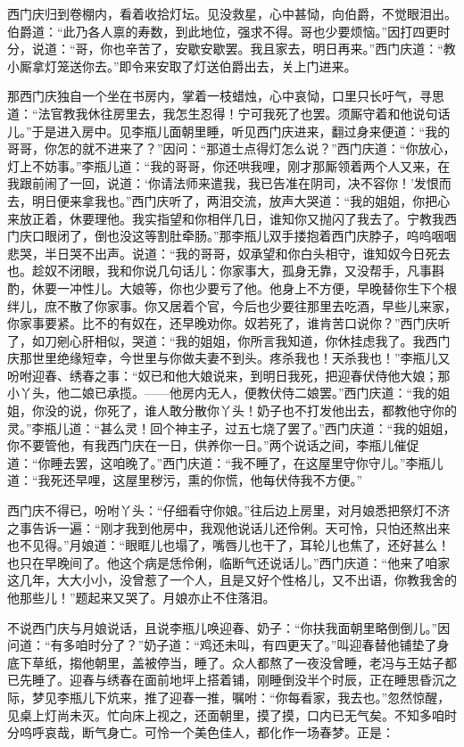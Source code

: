 西门庆归到卷棚内，看着收拾灯坛。见没救星，心中甚恸，向伯爵，不觉眼泪出。伯爵道：“此乃各人禀的寿数，到此地位，强求不得。哥也少要烦恼。”因打四更时分，说道：“哥，你也辛苦了，安歇安歇罢。我且家去，明日再来。”西门庆道：“教小厮拿灯笼送你去。”即令来安取了灯送伯爵出去，关上门进来。

那西门庆独自一个坐在书房内，掌着一枝蜡烛，心中哀恸，口里只长吁气，寻思道：“法官教我休往房里去，我怎生忍得！宁可我死了也罢。须厮守着和他说句话儿。”于是进入房中。见李瓶儿面朝里睡，听见西门庆进来，翻过身来便道：“我的哥哥，你怎的就不进来了？”因问：“那道士点得灯怎么说？”西门庆道：“你放心，灯上不妨事。”李瓶儿道：“我的哥哥，你还哄我哩，刚才那厮领着两个人又来，在我跟前闹了一回，说道：‘你请法师来遣我，我已告准在阴司，决不容你！’发恨而去，明日便来拿我也。”西门庆听了，两泪交流，放声大哭道：“我的姐姐，你把心来放正着，休要理他。我实指望和你相伴几日，谁知你又抛闪了我去了。宁教我西门庆口眼闭了，倒也没这等割肚牵肠。”那李瓶儿双手搂抱着西门庆脖子，呜呜咽咽悲哭，半日哭不出声。说道：“我的哥哥，奴承望和你白头相守，谁知奴今日死去也。趁奴不闭眼，我和你说几句话儿：你家事大，孤身无靠，又没帮手，凡事斟酌，休要一冲性儿。大娘等，你也少要亏了他。他身上不方便，早晚替你生下个根绊儿，庶不散了你家事。你又居着个官，今后也少要往那里去吃酒，早些儿来家，你家事要紧。比不的有奴在，还早晚劝你。奴若死了，谁肯苦口说你？”西门庆听了，如刀剜心肝相似，哭道：“我的姐姐，你所言我知道，你休挂虑我了。我西门庆那世里绝缘短幸，今世里与你做夫妻不到头。疼杀我也！天杀我也！”李瓶儿又吩咐迎春、绣春之事：“奴已和他大娘说来，到明日我死，把迎春伏侍他大娘；那小丫头，他二娘已承揽。——他房内无人，便教伏侍二娘罢。”西门庆道：“我的姐姐，你没的说，你死了，谁人敢分散你丫头！奶子也不打发他出去，都教他守你的灵。”李瓶儿道：“甚么灵！回个神主子，过五七烧了罢了。”西门庆道：“我的姐姐，你不要管他，有我西门庆在一日，供养你一日。”两个说话之间，李瓶儿催促道：“你睡去罢，这咱晚了。”西门庆道：“我不睡了，在这屋里守你守儿。”李瓶儿道：“我死还早哩，这屋里秽污，熏的你慌，他每伏侍我不方便。”

西门庆不得已，吩咐丫头：“仔细看守你娘。”往后边上房里，对月娘悉把祭灯不济之事告诉一遍：“刚才我到他房中，我观他说话儿还伶俐。天可怜，只怕还熬出来也不见得。”月娘道：“眼眶儿也塌了，嘴唇儿也干了，耳轮儿也焦了，还好甚么！也只在早晚间了。他这个病是恁伶俐，临断气还说话儿。”西门庆道：“他来了咱家这几年，大大小小，没曾惹了一个人，且是又好个性格儿，又不出语，你教我舍的他那些儿！”题起来又哭了。月娘亦止不住落泪。

不说西门庆与月娘说话，且说李瓶儿唤迎春、奶子：“你扶我面朝里略倒倒儿。”因问道：“有多咱时分了？”奶子道：“鸡还未叫，有四更天了。”叫迎春替他铺垫了身底下草纸，搊他朝里，盖被停当，睡了。众人都熬了一夜没曾睡，老冯与王姑子都已先睡了。迎春与绣春在面前地坪上搭着铺，刚睡倒没半个时辰，正在睡思昏沉之际，梦见李瓶儿下炕来，推了迎春一推，嘱咐：“你每看家，我去也。”忽然惊醒，见桌上灯尚未灭。忙向床上视之，还面朝里，摸了摸，口内已无气矣。不知多咱时分呜呼哀哉，断气身亡。可怜一个美色佳人，都化作一场春梦。正是：

